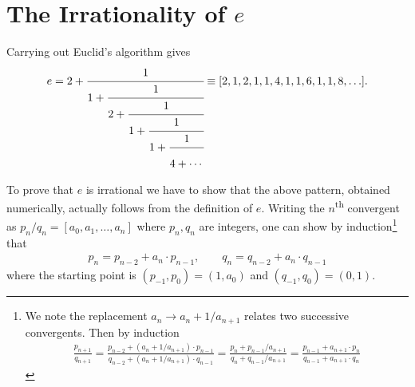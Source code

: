 \documentclass{article}
\theoremstyle{theorem}
\theoremstyle{definition}
\begin{document}
\section{The Irrationality of $e$}
Carrying out Euclid's algorithm gives
\begin{eqnarray*}
e =
2+\cfrac{1}{1+\cfrac{1}{2+\cfrac{1}{1+\cfrac{1}{1+
				\cfrac{1}{4+
							\cdots\vphantom{\cfrac{1}{1}} }}}}}
\equiv
 [2, 1, 2, 1, 1, 4, 1, 1, 6, 1, 1, 8, \ldots]. 
\end{eqnarray*}
To prove that $e$ is irrational we have to show that the above pattern, obtained numerically, actually follows from the definition of $e$. Writing the $n$\textsuperscript{th} convergent as $p_n/q_n=[a_0,a_1,\ldots,a_n]$ where $p_n,q_n$ are integers, one can show by induction\footnote{We note the replacement $a_n \rightarrow a_n + 1/a_{n+1}$ relates two successive convergents. Then by induction
\begin{eqnarray*}
	\frac{p_{n+1}}{q_{n+1}} = \frac{p_{n-2} + (a_n+1/a_{n+1}) \cdot p_{n-1}}{q_{n-2} + (a_n+1/a_{n+1}) \cdot q_{n-1}}	
	= \frac{p_{n} + p_{n-1}/a_{n+1}}{q_{n} + q_{n-1}/a_{n+1}} 
	= \frac{p_{n-1} + a_{n+1} \cdot p_{n}}{q_{n-1} + a_{n+1} \cdot q_{n}}
\end{eqnarray*}} 
that 
\begin{eqnarray*}
p_n = p_{n-2} + a_n \cdot p_{n-1}, \qquad
q_n = q_{n-2} + a_n \cdot q_{n-1}
\end{eqnarray*}
where the starting point is $(p_{-1},  p_0) = (1, a_0)$ and $(q_{-1},  q_0) =  (0, 1)$.
\end{document}
